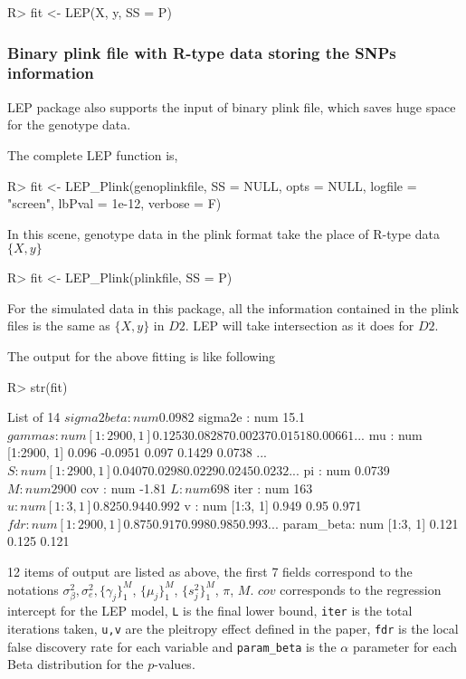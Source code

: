 \documentclass[11pt]{article}
\begin{document}
\begin{Schunk}
\begin{Sinput}
R> fit <- LEP(X, y, SS = P)
\end{Sinput}
\end{Schunk}


\subsubsection{Binary plink file with R-type data storing the SNPs information}
LEP package also supports the input of binary plink file, which saves huge space for the genotype data.

The complete LEP function is,
\begin{Schunk}
\begin{Sinput}
R> fit <- LEP_Plink(genoplinkfile, SS = NULL, opts = NULL, logfile = "screen", lbPval = 1e-12,
       verbose = F)
\end{Sinput}
\end{Schunk}

In this scene,  genotype data in the plink format take the place of R-type data $\{X, y\}$
\begin{Schunk}
\begin{Sinput}
R> fit <- LEP_Plink(plinkfile, SS = P)
\end{Sinput}
\end{Schunk}
For the simulated data in this package, all the information contained in the plink files is the same as $\{X, y\}$ in $D2$. LEP will take intersection as it does for $D2$.



The output for the above fitting is like following
\begin{Schunk}
\begin{Sinput}
R> str(fit)
\end{Sinput}
\begin{Soutput}
List of 14
 $ sigma2beta: num 0.0982
 $ sigma2e   : num 15.1
 $ gammas    : num [1:2900, 1] 0.1253 0.08287 0.00237 0.01518 0.00661 ...
 $ mu        : num [1:2900, 1] 0.096 -0.0951 0.097 0.1429 0.0738 ...
 $ S         : num [1:2900, 1] 0.0407 0.0298 0.0229 0.0245 0.0232 ...
 $ pi        : num 0.0739
 $ M         : num 2900
 $ cov       : num -1.81
 $ L         : num 698
 $ iter      : num 163
 $ u         : num [1:3, 1] 0.825 0.944 0.992
 $ v         : num [1:3, 1] 0.949 0.95 0.971
 $ fdr       : num [1:2900, 1] 0.875 0.917 0.998 0.985 0.993 ...
 $ param_beta: num [1:3, 1] 0.121 0.125 0.121
\end{Soutput}
\end{Schunk}
12 items of output are listed as above, the first 7 fields correspond to the notations $\sigma^2_{\beta},\sigma^2_e, \{\gamma_j\}_1^{M}$, $\{\mu_j\}_1^M$, $\{s^2_j\}_1^M$, $\pi$, $M$. $cov$ corresponds to the regression intercept for the LEP model, \texttt{L} is the final lower bound, \texttt{iter} is the total iterations taken, \texttt{u,v} are the pleitropy effect defined in the paper, \texttt{fdr} is the local false discovery rate for each variable and \texttt{param\_beta} is the $\alpha$ parameter for each Beta distribution for the $p$-values.
\end{document}
